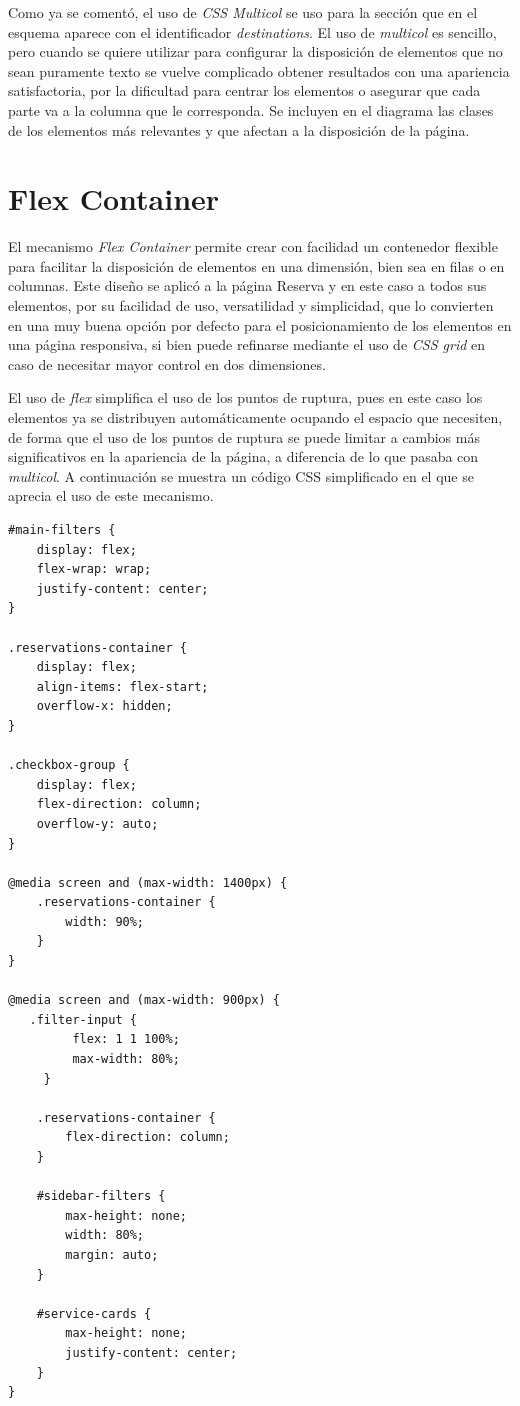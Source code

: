 \documentclass[11pt, a4paper]{book}
\begin{document}
    Como ya se comentó, el uso de \textit{CSS Multicol} se uso para la sección que en el esquema aparece con el identificador \textit{destinations}. El uso de \textit{multicol} es sencillo, pero cuando se quiere utilizar para configurar la disposición de elementos que no sean puramente texto se vuelve complicado obtener resultados con una apariencia satisfactoria, por la dificultad para centrar los elementos o asegurar que cada parte va a la columna que le corresponda. Se incluyen en el diagrama las clases de los elementos más relevantes y que afectan a la disposición de la página.

	\section{Flex Container}

    El mecanismo \textit{Flex Container} permite crear con facilidad un contenedor flexible para facilitar la disposición de elementos en una dimensión, bien sea en filas o en columnas. Este diseño se aplicó a la página Reserva y en este caso a todos sus elementos, por su facilidad de uso, versatilidad y simplicidad, que lo convierten en una muy buena opción por defecto para el posicionamiento de los elementos en una página responsiva, si bien puede refinarse mediante el uso de \textit{CSS grid} en caso de necesitar mayor control en dos dimensiones.

    El uso de \textit{flex} simplifica el uso de los puntos de ruptura, pues en este caso los elementos ya se distribuyen automáticamente ocupando el espacio que necesiten, de forma que el uso de los puntos de ruptura se puede limitar a cambios más significativos en la apariencia de la página, a diferencia de lo que pasaba con \textit{multicol}. A continuación se muestra un código CSS simplificado en el que se aprecia el uso de este mecanismo.

	\begin{lstlisting}[]
#main-filters {
    display: flex;
    flex-wrap: wrap;
    justify-content: center;
}

.reservations-container {
    display: flex;
    align-items: flex-start;
    overflow-x: hidden;
}

.checkbox-group {
    display: flex;
    flex-direction: column;
    overflow-y: auto;
}

@media screen and (max-width: 1400px) {
    .reservations-container {
        width: 90%;
    }
}

@media screen and (max-width: 900px) {
   .filter-input {
         flex: 1 1 100%;
         max-width: 80%;
     }

    .reservations-container {
        flex-direction: column;
    }

    #sidebar-filters {
        max-height: none;
        width: 80%;
        margin: auto;
    }

    #service-cards {
        max-height: none;
        justify-content: center;
    }
}
	\end{lstlisting}
\end{document}
